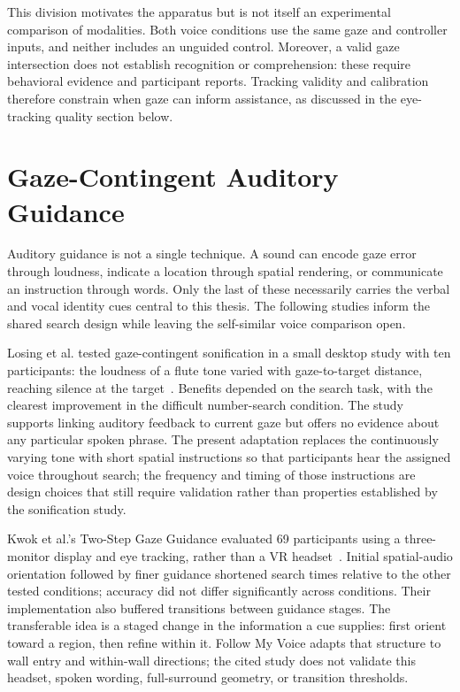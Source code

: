 This division motivates the apparatus but is not itself an experimental comparison of modalities. Both voice conditions use the same gaze and controller inputs, and neither includes an unguided control. Moreover, a valid gaze intersection does not establish recognition or comprehension: these require behavioral evidence and participant reports. Tracking validity and calibration therefore constrain when gaze can inform assistance, as discussed in the eye-tracking quality section below.

\section{Gaze-Contingent Auditory Guidance}
Auditory guidance is not a single technique. A sound can encode gaze error through loudness, indicate a location through spatial rendering, or communicate an instruction through words. Only the last of these necessarily carries the verbal and vocal identity cues central to this thesis. The following studies inform the shared search design while leaving the self-similar voice comparison open.

Losing et al. tested gaze-contingent sonification in a small desktop study with ten participants: the loudness of a flute tone varied with gaze-to-target distance, reaching silence at the target~\cite{losing2014guiding}. Benefits depended on the search task, with the clearest improvement in the difficult number-search condition. The study supports linking auditory feedback to current gaze but offers no evidence about any particular spoken phrase. The present adaptation replaces the continuously varying tone with short spatial instructions so that participants hear the assigned voice throughout search; the frequency and timing of those instructions are design choices that still require validation rather than properties established by the sonification study.

Kwok et al.'s Two-Step Gaze Guidance evaluated 69 participants using a three-monitor display and eye tracking, rather than a VR headset~\cite{kwok2022twostep}. Initial spatial-audio orientation followed by finer guidance shortened search times relative to the other tested conditions; accuracy did not differ significantly across conditions. Their implementation also buffered transitions between guidance stages. The transferable idea is a staged change in the information a cue supplies: first orient toward a region, then refine within it. Follow My Voice adapts that structure to wall entry and within-wall directions; the cited study does not validate this headset, spoken wording, full-surround geometry, or transition thresholds.

